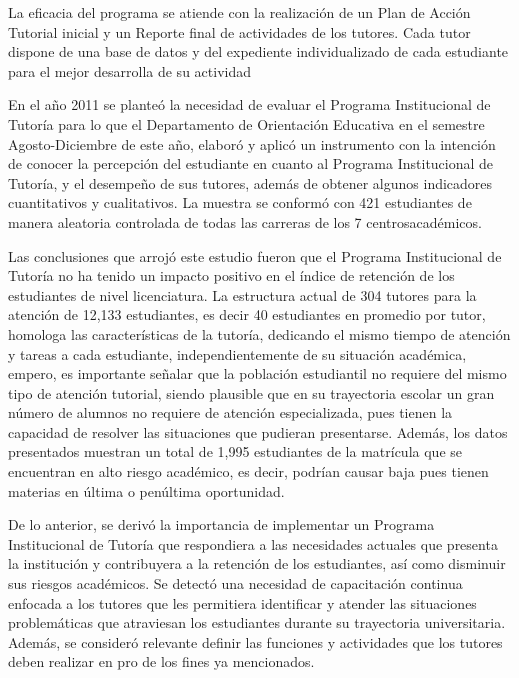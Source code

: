 La eficacia del programa se atiende con la realización de un Plan de Acción
Tutorial inicial y un Reporte final de actividades de los tutores. Cada
tutor dispone de una base de datos y del expediente individualizado de cada
estudiante para el mejor desarrolla de su actividad

En el año 2011 se planteó la necesidad de evaluar el Programa Institucional
de Tutoría para lo que el Departamento de Orientación Educativa en el
semestre Agosto-Diciembre de este año, elaboró y aplicó un instrumento con
la intención de conocer la percepción del estudiante en cuanto al Programa
Institucional de Tutoría, y el desempeño de sus tutores, además de obtener
algunos indicadores cuantitativos y cualitativos. La muestra se conformó
con 421 estudiantes de manera aleatoria controlada de todas las carreras de
los 7 centros\linebreak académicos.

Las conclusiones que arrojó este estudio fueron que el  Programa
Institucional de Tutoría no ha tenido un impacto positivo en el índice de
retención de los estudiantes de nivel licenciatura. La estructura actual de
304 tutores para la atención de 12,133 estudiantes, es decir 40 estudiantes
en promedio por tutor, homologa las características de la tutoría,
dedicando el mismo tiempo de atención y tareas a cada estudiante,
independientemente de su situación académica, empero, es importante señalar
que la población estudiantil no requiere del mismo tipo de atención
tutorial, siendo plausible que en su trayectoria escolar un gran número de
alumnos no requiere de atención especializada, pues tienen la capacidad de
resolver las situaciones que pudieran presentarse. Además, los datos
presentados muestran un total de 1,995 estudiantes de la matrícula que se
encuentran en alto riesgo académico, es decir, podrían causar baja pues
tienen materias en última o penúltima oportunidad.

De lo anterior, se derivó la importancia de implementar un Programa
Institucional de Tutoría que respondiera a las necesidades actuales que
presenta la institución y contribuyera a la retención de los estudiantes,
así como disminuir sus riesgos académicos. Se detectó una necesidad de
capacitación continua enfocada a los tutores que les permitiera identificar
y atender las situaciones problemáticas que atraviesan los estudiantes
durante su trayectoria universitaria. Además, se consideró relevante
definir las funciones y actividades que los tutores deben realizar en pro
de los fines ya mencionados.
\newpage

